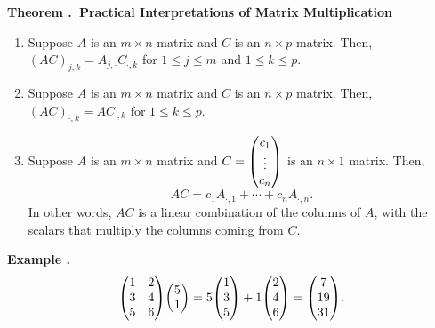 \documentclass[11pt, letterpaper]{article}
\newcounter{index}[subsection]
\newenvironment*{eg}{\begin{framed}\par\noindent\textbf{Example \thesubsection.\stepcounter{index}\theindex}}{\par\end{framed}}
\newenvironment*{thm}[1]{\begin{tcolorbox}\par\noindent\textbf{Theorem \thesubsection.\stepcounter{index}\theindex\ #1} \par}{\par\end{tcolorbox}}
\begin{document}
\begin{thm}{Practical Interpretations of Matrix Multiplication}
	\begin{enumerate}
		\item Suppose $A$ is an $m\times n$ matrix and $C$ is an $n\times p$ matrix. Then, $(AC)_{j,k}=A_{j,\cdot}C_{\cdot,k}$ for $1\leq j\leq m$ and $1\leq k\leq p.$
		\item Suppose $A$ is an $m\times n$ matrix and $C$ is an $n\times p$ matrix. Then, $(AC)_{\cdot,k}=AC_{\cdot,k}$ for $1\leq k\leq p.$
		\item Suppose $A$ is an $m\times n$ matrix and $C=\mqty(c_1\\\vdots\\c_n)$ is an $n\times1$ matrix. Then, \[AC=c_1A_{\cdot,1}+\cdots+c_nA_{\cdot,n}.\] In other words, $AC$ is a linear combination of the columns of $A$, with the scalars that multiply the columns coming from $C$.
	\end{enumerate}	
\end{thm}
\begin{eg}
	\[\mqty(1&2\\3&4\\5&6)\mqty(5\\1)=5\mqty(1\\3\\5)+1\mqty(2\\4\\6)=\mqty(7\\19\\31).\]	
\end{eg}

\newpage
\end{document}
